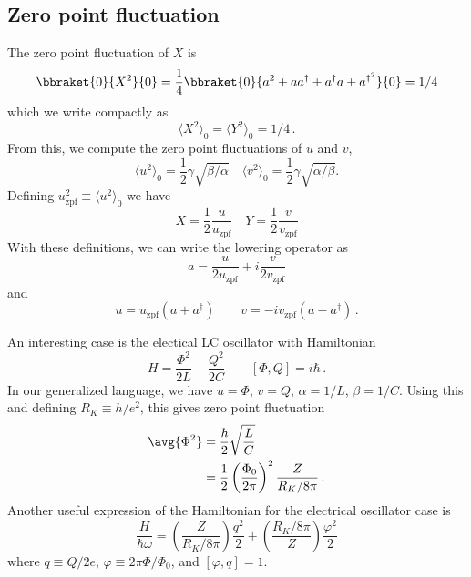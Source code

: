 \subsection{Zero point fluctuation}

The zero point fluctuation of $X$ is
\begin{equation}
\bbraket{0}{X^2}{0} = \frac{1}{4}\bbraket{0}{a^2 + aa^{\dagger} + a^{\dagger}a + a^{\dagger^2}}{0} = 1/4
\end{equation}
which we write compactly as
\begin{equation}
\langle X^2 \rangle_0 = \langle Y^2 \rangle_0 = 1/4 \, .
\end{equation}
From this, we compute the zero point fluctuations of $u$ and $v$, \begin{equation}
\langle u^2 \rangle_0 = \frac{1}{2}\gamma \sqrt{\beta / \alpha} \quad \langle v^2 \rangle_0 = \frac{1}{2}\gamma \sqrt{\alpha / \beta} . \end{equation}
Defining $u_{\textrm{zpf}}^2 \equiv \langle u^2 \rangle_0 $ we have \begin{equation}
X = \frac{1}{2}\frac{u}{u_{\textrm{zpf}}} \quad Y = \frac{1}{2}\frac{v}{v_{\textrm{zpf}}} \end{equation}
With these definitions, we can write the lowering operator as
\begin{equation}
a = \frac{u}{2 u_\text{zpf}} + i \frac{v}{2 v_\text{zpf}}
\end{equation}
and
\begin{equation}
  u = u_\text{zpf}(a + a^\dagger) \qquad v = -i v_\text{zpf} (a - a^\dagger) \, .
\end{equation}

An interesting case is the electical LC oscillator with Hamiltonian
\begin{equation*}
  H = \frac{\Phi^2}{2L} + \frac{Q^2}{2C} \qquad [\Phi, Q] = i \hbar \, .
\end{equation*}
In our generalized language, we have $u = \Phi$, $v=Q$, $\alpha=1/L$, $\beta = 1/C$.
Using this and defining $R_K \equiv h/e^2$, this gives zero point fluctuation
\begin{align*}
  \avg{\Phi^2}
  &= \frac{\hbar}{2} \sqrt{\frac{L}{C}} \\
  &= \frac{1}{2} \left( \frac{\Phi_0}{2\pi} \right)^2 \frac{Z}{R_K/8\pi} \, .
\end{align*}
Another useful expression of the Hamiltonian for the electrical oscillator case is
\begin{equation*}
  \frac{H}{\hbar \omega} =
      \left( \frac{Z}{R_K / 8 \pi} \right) \frac{q^2}{2}
    + \left( \frac{R_K / 8 \pi}{Z} \right) \frac{\varphi^2}{2}
\end{equation*}
where $q \equiv Q / 2 e$, $\varphi \equiv 2\pi \Phi / \Phi_0$, and $[\varphi, q] = 1$.

